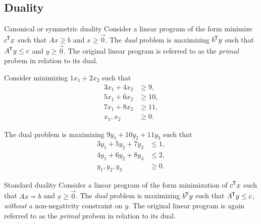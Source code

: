 \subsection{Duality}

\begin{defn}{Canonical or symmetric duality}\proofbreak
    Consider a linear program of the form minimize ${c}^{\mkern-1.5mu\mathsf{T}}x$ such that $Ax \geq b$ and $x \geq \vec{0}$. The \emph{dual} problem is maximizing ${b}^{\mkern-1.5mu\mathsf{T}}y$ such that ${A}^{\mkern-1.5mu\mathsf{T}}y \leq c$ and $y \geq \vec{0}$. The original linear program is referred to as the \emph{primal} probem in relation to its dual.
\end{defn}

\begin{exmp}
    Consider minimizing $1x_1 + 2x_2$ such that
    \begin{align*}
        3x_1 + 4x_2 &\geq 9, \\
        5x_1 + 6x_2 &\geq 10, \\
        7x_1 + 8x_2 &\geq 11, \\
        x_1, x_2 &\geq 0.
    \end{align*}

    The dual problem is maximizing $9y_1 + 10y_2 + 11y_3$ such that
    \begin{align*}
        3y_1 + 5y_2 + 7y_3  &\leq 1, \\
        4y_1 + 6y_2 + 8y_3  &\leq 2, \\
        y_1, y_2, y_3 &\geq 0.
    \end{align*}
\end{exmp}

\begin{defn}{Standard duality}\proofbreak
    Consider a linear program of the form minimization of ${c}^{\mkern-1.5mu\mathsf{T}}x$ such that $Ax = b$ and $x \geq \vec{0}$. The \emph{dual} problem is maximizing ${b}^{\mkern-1.5mu\mathsf{T}}y$ such that ${A}^{\mkern-1.5mu\mathsf{T}}y \leq c$, \emph{without} a non-negativity constraint on $y$. The original linear program is again referred to as the \emph{primal} probem in relation to its dual.
\end{defn}


